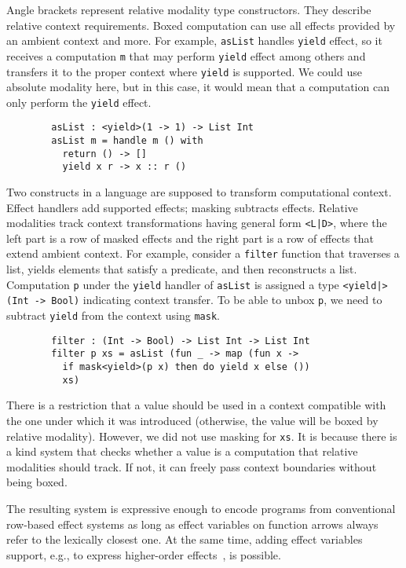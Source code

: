\documentclass[conference]{IEEEtran}
\begin{document}
    Angle brackets represent relative modality type constructors.
    They describe relative context requirements.
    Boxed computation can use all effects provided by an ambient context and more.
    For example, \texttt{asList} handles \texttt{yield} effect, so it receives a computation \texttt{m} that may perform \texttt{yield} effect among others and transfers it to the proper context where \texttt{yield} is supported.
    We could use absolute modality here, but in this case, it would mean that a computation can only perform the \texttt{yield} effect.
    \begin{verbatim}
        asList : <yield>(1 -> 1) -> List Int
        asList m = handle m () with
          return () -> []
          yield x r -> x :: r ()
    \end{verbatim}

    Two constructs in a language are supposed to transform computational context.
    Effect handlers add supported effects; masking subtracts effects.
    Relative modalities track context transformations having general form \texttt{<L|D>}, where the left part is a row of masked effects and the right part is a row of effects that extend ambient context.
    For example, consider a \texttt{filter} function that traverses a list, yields elements that satisfy a predicate, and then reconstructs a list.
    Computation \texttt{p} under the \texttt{yield} handler of \texttt{asList} is assigned a type \texttt{<yield|>(Int -> Bool)} indicating context transfer.
    To be able to unbox \texttt{p}, we need to subtract \texttt{yield} from the context using \texttt{mask}.
    \begin{verbatim}
        filter : (Int -> Bool) -> List Int -> List Int
        filter p xs = asList (fun _ -> map (fun x ->
          if mask<yield>(p x) then do yield x else ())
          xs)
    \end{verbatim}

    There is a restriction that a value should be used in a context compatible with the one under which it was introduced (otherwise, the value will be boxed by relative modality).
    However, we did not use masking for \texttt{xs}.
    It is because there is a kind system that checks whether a value is a computation that relative modalities should track.
    If not, it can freely pass context boundaries without being boxed.

    The resulting system is expressive enough to encode programs from conventional row-based effect systems as long as effect variables on function arrows always refer to the lexically closest one.
    At the same time, adding effect variables support, e.g., to express higher-order effects~\cite{wu2014effect}, is possible.
\end{document}
